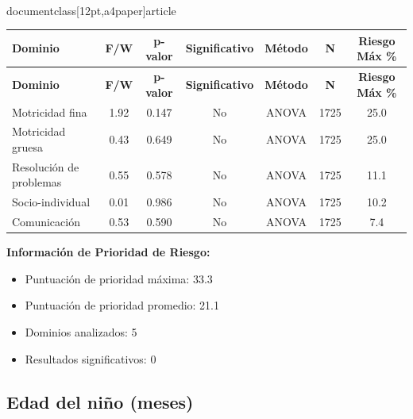 \\documentclass[12pt,a4paper]{article}
\begin{document}
\begin{longtable}{|l|c|c|c|c|c|c|}
\hline
\textbf{Dominio} & \textbf{F/W} & \textbf{p-valor} & \textbf{Significativo} & \textbf{Método} & \textbf{N} & \textbf{Riesgo Máx \%} \\
\hline
\endfirsthead

\hline
\textbf{Dominio} & \textbf{F/W} & \textbf{p-valor} & \textbf{Significativo} & \textbf{Método} & \textbf{N} & \textbf{Riesgo Máx \%} \\
\hline
\endhead

\hline
\endfoot

\hline
\endlastfoot

Motricidad fina & 1.92 & 0.147 & No & ANOVA & 1725 & 25.0 \\
Motricidad gruesa & 0.43 & 0.649 & No & ANOVA & 1725 & 25.0 \\
Resolución de problemas & 0.55 & 0.578 & No & ANOVA & 1725 & 11.1 \\
Socio-individual & 0.01 & 0.986 & No & ANOVA & 1725 & 10.2 \\
Comunicación & 0.53 & 0.590 & No & ANOVA & 1725 & 7.4 \\

\end{longtable}


\textbf{Información de Prioridad de Riesgo:}
\begin{itemize}
\item Puntuación de prioridad máxima: 33.3
\item Puntuación de prioridad promedio: 21.1
\item Dominios analizados: 5
\item Resultados significativos: 0
\end{itemize}


\subsection{Edad del niño (meses)}
\end{document}
